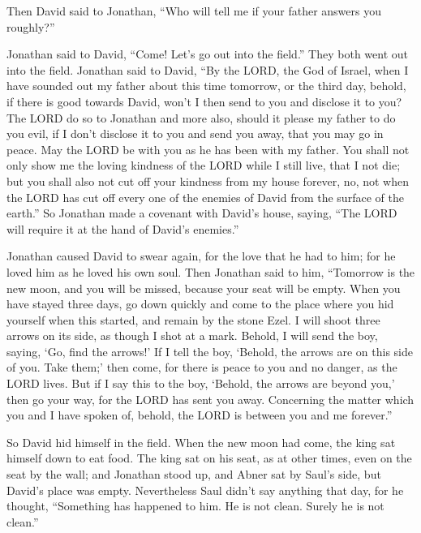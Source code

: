  Then David said to Jonathan, ``Who will tell me if your
father answers you roughly?''

 Jonathan said to David, ``Come! Let's go out into the
field.'' They both went out into the field.  Jonathan said
to David, ``By the LORD, the God of Israel, when I have sounded out my
father about this time tomorrow, or the third day, behold, if there is
good towards David, won't I then send to you and disclose it to you?
 The LORD do so to Jonathan and more also, should it please
my father to do you evil, if I don't disclose it to you and send you
away, that you may go in peace. May the LORD be with you as he has been
with my father.  You shall not only show me the loving
kindness of the LORD while I still live, that I not die; 
but you shall also not cut off your kindness from my house forever, no,
not when the LORD has cut off every one of the enemies of David from the
surface of the earth.''  So Jonathan made a covenant with
David's house, saying, ``The LORD will require it at the hand of David's
enemies.''

 Jonathan caused David to swear again, for the love that he
had to him; for he loved him as he loved his own soul. 
Then Jonathan said to him, ``Tomorrow is the new moon, and you will be
missed, because your seat will be empty.  When you have
stayed three days, go down quickly and come to the place where you hid
yourself when this started, and remain by the stone Ezel. 
I will shoot three arrows on its side, as though I shot at a mark.
 Behold, I will send the boy, saying, `Go, find the
arrows!' If I tell the boy, `Behold, the arrows are on this side of you.
Take them;' then come, for there is peace to you and no danger, as the
LORD lives.  But if I say this to the boy, `Behold, the
arrows are beyond you,' then go your way, for the LORD has sent you
away.  Concerning the matter which you and I have spoken
of, behold, the LORD is between you and me forever.''

 So David hid himself in the field. When the new moon had
come, the king sat himself down to eat food.  The king sat
on his seat, as at other times, even on the seat by the wall; and
Jonathan stood up, and Abner sat by Saul's side, but David's place was
empty.  Nevertheless Saul didn't say anything that day, for
he thought, ``Something has happened to him. He is not clean. Surely he
is not clean.''

